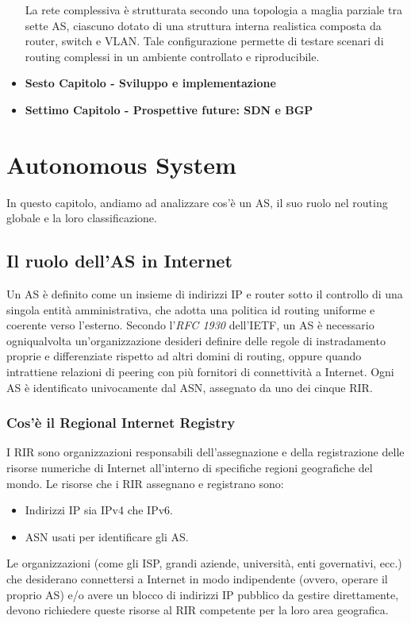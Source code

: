 \documentclass[12pt,a4paper,twoside]{book}
\begin{document}
\begin{itemize}
    La rete complessiva è strutturata secondo una topologia a maglia parziale tra sette \ac{AS}, ciascuno dotato di una struttura interna realistica composta da router, switch e VLAN. Tale configurazione permette di testare scenari di routing complessi in un ambiente controllato e riproducibile.
    \item \textbf{Sesto Capitolo - Sviluppo e implementazione}
    \item \textbf{Settimo Capitolo - Prospettive future: SDN e BGP}
\end{itemize}

\chapter{Autonomous System}
In questo capitolo, andiamo ad analizzare cos'è un \ac{AS}, il suo ruolo nel routing globale e la loro classificazione.

\section{Il ruolo dell'AS in Internet}
Un \ac{AS} è definito come un insieme di indirizzi IP e router sotto il controllo di una singola entità amministrativa, che adotta una politica id routing uniforme e coerente verso l'esterno.
Secondo l’\textit{RFC 1930} dell’IETF, un \ac{AS} è necessario ogniqualvolta un’organizzazione desideri definire delle regole di instradamento proprie e differenziate rispetto ad altri domini di routing, oppure quando intrattiene relazioni di peering con più fornitori di connettività a Internet.
Ogni \ac{AS} è identificato univocamente dal \ac{ASN}, assegnato da uno dei cinque \ac{RIR}. \cite{cloudflareAS} \cite{rfc1930}

\subsection{Cos'è il Regional Internet Registry}
I \ac{RIR} sono organizzazioni responsabili dell'assegnazione e della registrazione delle risorse numeriche di Internet all'interno di specifiche regioni geografiche del mondo.
Le risorse che i \ac{RIR} assegnano e registrano sono:
\begin{itemize}
    \item Indirizzi IP sia IPv4 che IPv6.
    \item \ac{ASN} usati per identificare gli \ac{AS}.
\end{itemize}
Le organizzazioni (come gli \ac{ISP}, grandi aziende, università, enti governativi, ecc.) che desiderano connettersi a Internet in modo indipendente (ovvero, operare il proprio \ac{AS}) e/o avere un blocco di indirizzi IP pubblico da gestire direttamente, devono richiedere queste risorse al \ac{RIR} competente per la loro area geografica.
\end{document}

